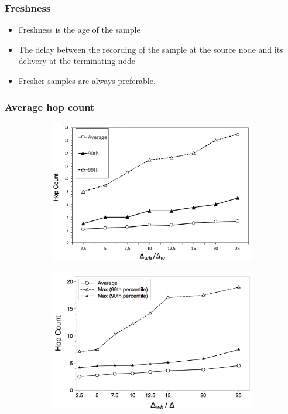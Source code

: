 \documentclass{beamer}
\begin{document}
\begin{frame}
\frametitle{Freshness}

\begin{itemize}
  \item Freshness is the age of the sample
  \item The delay between the recording of the sample at the source node and its delivery at the terminating node
  \item Fresher samples are always preferable.
\end{itemize}

\end{frame}

\begin{frame}
\frametitle{Average hop count}

\begin{figure}
\centering
\begin{subfigure}{.5\textwidth}
  \centering
  \includegraphics[keepaspectratio=true, width=1\linewidth]{images/average_hop_count}
  \caption{}
  \label{fig:my_average_hop_count}
\end{subfigure}%
\begin{subfigure}{.5\textwidth}
  \centering
  \includegraphics[keepaspectratio=true, width=1\linewidth]{images/paper_average_hop_count}

\end{subfigure}
\end{figure}
\end{frame}
\end{document}
